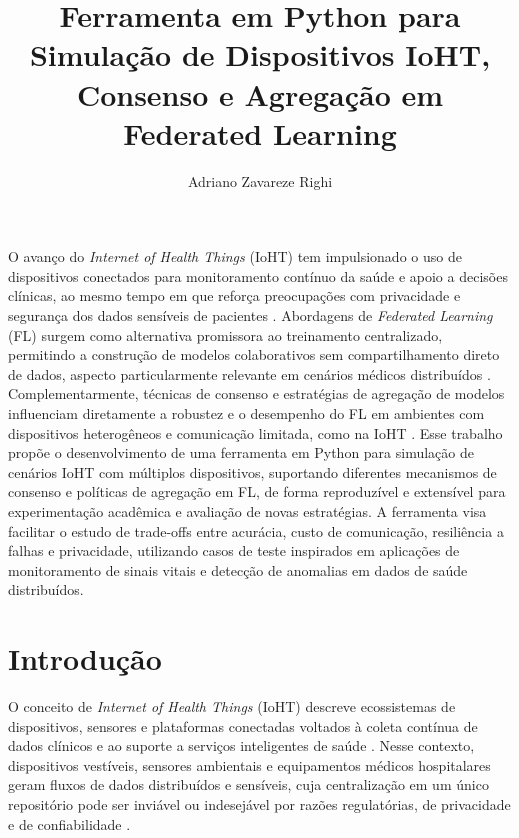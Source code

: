 \documentclass[12pt]{article}
\title{Ferramenta em Python para Simulação de Dispositivos IoHT, Consenso e Agregação em Federated Learning}
\author{Adriano Zavareze Righi\inst{1}}
\begin{document}
\maketitle

\begin{resumo}
O avanço do \textit{Internet of Health Things} (IoHT) tem impulsionado o uso de dispositivos conectados para monitoramento contínuo da saúde e apoio a decisões clínicas, ao mesmo tempo em que reforça preocupações com privacidade e segurança dos dados sensíveis de pacientes \cite{Kumar2020_SecureIoHT}. Abordagens de \textit{Federated Learning} (FL) surgem como alternativa promissora ao treinamento centralizado, permitindo a construção de modelos colaborativos sem compartilhamento direto de dados, aspecto particularmente relevante em cenários médicos distribuídos \cite{Nevrataki2023_SurveyFLApplications}. Complementarmente, técnicas de consenso e estratégias de agregação de modelos influenciam diretamente a robustez e o desempenho do FL em ambientes com dispositivos heterogêneos e comunicação limitada, como na IoHT \cite{Zhang2024_FLIoTSurvey}. Esse trabalho propõe o desenvolvimento de uma ferramenta em Python para simulação de cenários IoHT com múltiplos dispositivos, suportando diferentes mecanismos de consenso e políticas de agregação em FL, de forma reproduzível e extensível para experimentação acadêmica e avaliação de novas estratégias. A ferramenta visa facilitar o estudo de trade-offs entre acurácia, custo de comunicação, resiliência a falhas e privacidade, utilizando casos de teste inspirados em aplicações de monitoramento de sinais vitais e detecção de anomalias em dados de saúde distribuídos.
\end{resumo}

\section{Introdução}

O conceito de \textit{Internet of Health Things} (IoHT) descreve ecossistemas de dispositivos, sensores e plataformas conectadas voltados à coleta contínua de dados clínicos e ao suporte a serviços inteligentes de saúde \cite{Kumar2020_SecureIoHT}. Nesse contexto, dispositivos vestíveis, sensores ambientais e equipamentos médicos hospitalares geram fluxos de dados distribuídos e sensíveis, cuja centralização em um único repositório pode ser inviável ou indesejável por razões regulatórias, de privacidade e de confiabilidade \cite{Kumar2020_SecureIoHT,Nevrataki2023_SurveyFLApplications}. 
\end{document}
